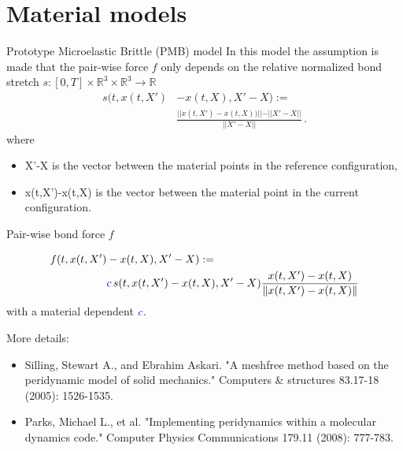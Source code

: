 \documentclass[12pt,t]{beamer}
\begin{document}
\section{Material models}

\begin{frame}{Prototype Microelastic Brittle (PMB) model}
In this model the assumption is made that the pair-wise force $f$ only depends on the relative normalized bond stretch $s:[0,T]\times\mathbb{R}^3\times\mathbb{R}^3\rightarrow\mathbb{R}$
\begin{align*}
s(t,x(t,X')&-x(t,X),X'-X):= \\ &\frac{\vert\vert x(t,X')-x(t,X))\vert\vert - \vert\vert X'-X\vert\vert}{\vert\vert X'-X\vert\vert}\,\text{.} 
\end{align*}
where 
\begin{itemize}
\item X'-X is the vector between the material points in the reference configuration,
\item x(t,X')-x(t,X) is the vector between the material point in the current configuration.
\end{itemize}
\end{frame}


\begin{frame}{Pair-wise bond force $f$}

\begin{align*}
f(t,x(t,X')&-x(t,X),X'-X):= \notag\\ & \textcolor{blue}{c} \, s(t,x(t,X')-x(t,X),X'-X)\frac{x(t,X')-x(t,X)}{\Vert x(t,X')-x(t,X)\Vert}
\end{align*}
with a material dependent  $\textcolor{blue}{c}$.

\begin{block}{More details:}
\small
\begin{itemize}
\item  Silling, Stewart A., and Ebrahim Askari. "A meshfree method based on the peridynamic model of solid mechanics." Computers \& structures 83.17-18 (2005): 1526-1535.
\item Parks, Michael L., et al. "Implementing peridynamics within a molecular dynamics code." Computer Physics Communications 179.11 (2008): 777-783.
\end{itemize}

\end{block}
\end{frame}
\end{document}
